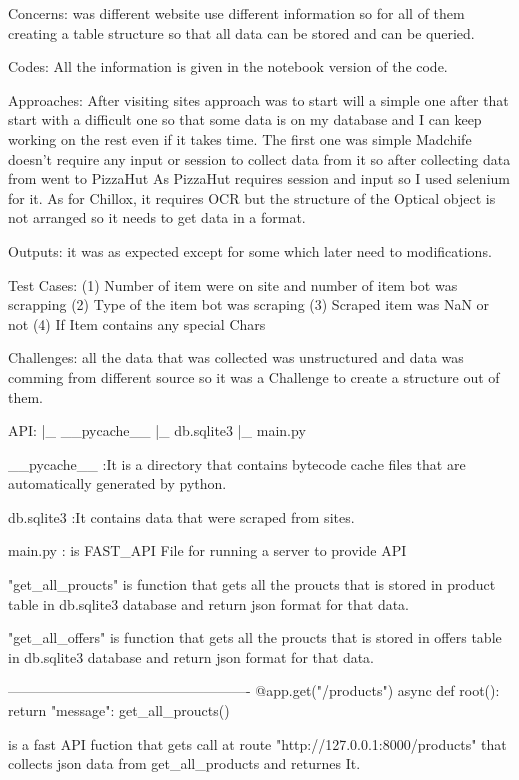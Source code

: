 Concerns: was different website use different information so for all of them creating a table structure so that all data can be stored and
          can be queried.

Codes: All the information is given in the notebook version of the code.

Approaches: After visiting sites approach was to start will a simple one after that start with a difficult one so
            that some data is on my database and I can keep working on the rest even if it takes time.
            The first one was simple Madchife doesn't require any input or session to collect data from it so after collecting data
            from went to PizzaHut
            As PizzaHut requires session and input so I used selenium for it. As for Chillox, it requires OCR but the structure of
            the Optical object is not arranged so it needs to get data in a format.

Outputs: it was as expected except for some which later need to modifications.

Test Cases:
    (1) Number of item were on site and number of item bot was scrapping
    (2) Type of the item bot was scraping
    (3) Scraped item was NaN or not
    (4) If Item contains any special Chars

Challenges: all the data that was collected was unstructured and data was comming from different source so it was a Challenge to create a
            structure out of them.


API:
    |_ __pycache__
    |_ db.sqlite3
    |_ main.py

    __pycache__ :It is a directory that contains bytecode cache files that are automatically generated by python.

    db.sqlite3 :It contains data that were scraped from sites.

    main.py : is FAST_API File for running a server to provide API

    "get_all_proucts" is function that gets all the proucts that is stored in product table in db.sqlite3 database and return json format for that data.

    "get_all_offers" is function that gets all the proucts that is stored in offers table in db.sqlite3 database and return json format for that data.

    ----------------------------------------------------
    @app.get("/products")
    async def root():
        return {"message": get_all_proucts()}

    is a fast API fuction that gets call at route "http://127.0.0.1:8000/products" that collects json data from get_all_products and returnes It.

